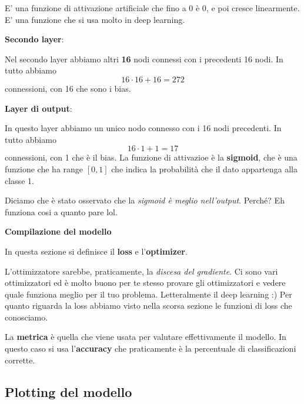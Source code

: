 E' una funzione di attivazione artificiale che fino a 0 è 0, e poi cresce
linearmente. E' una funzione che si usa molto in deep learning.

\textbf{Secondo layer}:

Nel secondo layer abbiamo altri \textbf{16} nodi connessi con i precedenti 16
nodi. In tutto abbiamo \[16 \cdot 16 + 16 = 272\] connessioni, con 16 che sono i bias.

\textbf{Layer di output}:

In questo layer abbiamo un unico nodo connesso con i 16 nodi precedenti. In
tutto abbiamo \[16 \cdot 1 + 1 = 17\] connessioni, con 1 che è il bias. La funzione di attivazioe è la
\textbf{sigmoid}, che è una funzione che ha range $[0,1]$ che indica la
probabilità che il dato appartenga alla classe 1.

Diciamo che è stato osservato che la \textit{sigmoid è meglio nell'output}.
Perché? Eh funziona cosi a quanto pare lol.


\textbf{Compilazione del modello}

In questa sezione si definisce il \textbf{loss} e l'\textbf{optimizer}.

L'ottimizzatore sarebbe, praticamente, la \textit{discesa del gradiente}. Ci
sono vari ottimizzatori ed è molto buono per te stesso provare gli
ottimizzatori e vedere quale funziona meglio per il tuo problema. Letteralmente
il deep learning :) Per quanto riguarda la loss abbiamo visto nella scorsa
sezione le funzioni di loss che conosciamo.

La \textbf{metrica} è quella che viene usata per valutare effettivamente il
modello. In questo caso si usa l'\textbf{accuracy} che praticamente è la
percentuale di classificazioni corrette.

\subsection{Plotting del modello}

